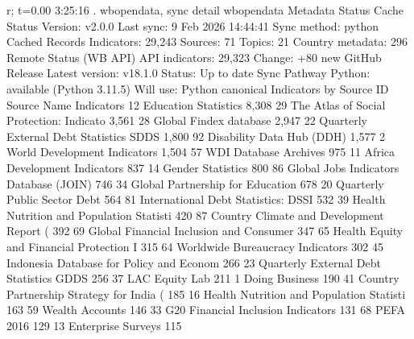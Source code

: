 r; t=0.00 3:25:16
{\smallskip}
. wbopendata, sync detail
{\smallskip}
wbopendata Metadata Status
{\smallskip}
  Cache Status
  Version:          v2.0.0
  Last sync:        9 Feb 2026 14:44:41
  Sync method:      python
{\smallskip}
  Cached Records
  Indicators:          29,243
  Sources:                 71
  Topics:                  21
  Country metadata:       296
{\smallskip}
  Remote Status (WB API)
  API indicators:      29,323
  Change:           +80 new
{\smallskip}
  GitHub Release
  Latest version:   v18.1.0
  Status:           Up to date
{\smallskip}
  Sync Pathway
  Python:           available (Python 3.11.5)
  Will use:         Python canonical
{\smallskip}
  Indicators by Source
{\smallskip}
   ID    Source Name                                  Indicators
   12    Education Statistics                            8,308
   29    The Atlas of Social Protection: Indicato        3,561
   28    Global Findex database                          2,947
   22    Quarterly External Debt Statistics SDDS         1,800
   92    Disability Data Hub (DDH)                       1,577
   2     World Development Indicators                    1,504
   57    WDI Database Archives                             975
   11    Africa Development Indicators                     837
   14    Gender Statistics                                 800
   86    Global Jobs Indicators Database (JOIN)            746
   34    Global Partnership for Education                  678
   20    Quarterly Public Sector Debt                      564
   81     International Debt Statistics: DSSI              532
   39    Health Nutrition and Population Statisti          420
   87    Country Climate and Development Report (          392
   69    Global Financial Inclusion and Consumer           347
   65    Health Equity and Financial Protection I          315
   64    Worldwide Bureaucracy Indicators                  302
   45    Indonesia Database for Policy and Econom          266
   23    Quarterly External Debt Statistics GDDS           256
   37    LAC Equity Lab                                    211
   1     Doing Business                                    190
   41    Country Partnership Strategy for India (          185
   16    Health Nutrition and Population Statisti          163
   59    Wealth Accounts                                   146
   33    G20 Financial Inclusion Indicators                131
   68    PEFA 2016                                         129
   13    Enterprise Surveys                                115
